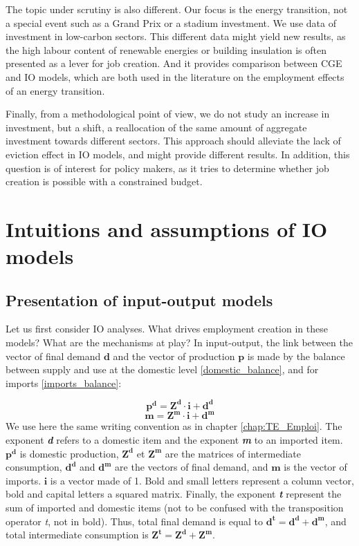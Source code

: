 The topic under scrutiny is also different. Our focus is the energy transition, not a special event such as a Grand Prix or a stadium investment. We use data of investment in low-carbon sectors. This different data might yield new results, as the high labour content of renewable energies or building insulation is often presented as a lever for job creation. And it provides comparison between CGE and IO models, which are both used in the literature on the employment effects of an energy transition.

Finally, from a methodological point of view, we do not study an increase in investment, but a shift, a reallocation of the same amount of aggregate investment towards different sectors. This approach should alleviate the lack of eviction effect in IO models, and might provide different results. In addition, this question is of interest for policy makers, as it tries to determine whether job creation is possible with a constrained budget.


\section{Intuitions and assumptions of IO models} \label{sec:intuition}

\subsection{Presentation of input-output models}
Let us first consider IO analyses. What drives employment creation in these models? What are the mechanisms at play?
In input-output, the link between the vector of final demand $\pmb{d}$ and the vector of production $\pmb{p}$ is made by the balance between supply and use at the domestic level \eqref{domestic_balance}, and for imports \eqref{imports_balance}:

\begin{equation}
\pmb{p^d} = \pmb{Z^d} \cdot \pmb{i} + \pmb{d^d}	
\label{domestic_balance}
\end{equation}
\begin{equation}
\pmb{m} = \pmb{Z^m} \cdot \pmb{i} + \pmb{d^m}	
\label{imports_balance}
\end{equation}
We use here the same writing convention as in chapter \ref{chap:TE_Emploi}. 
The exponent \textit{\textbf{d}} refers to a domestic item and the exponent \textit{\textbf{m}} to an imported item. 
$\pmb{p^d}$ is domestic production, $\pmb{Z^d}$ et $\pmb{Z^m}$ are the matrices of intermediate consumption, $\pmb{d^d}$ and $\pmb{d^m}$ are the vectors of final demand, and $\pmb{m}$ is the vector of imports. 
$\pmb{i}$ is a vector made of 1. 
Bold and small letters represent a column vector, bold and capital letters a squared matrix. Finally, the exponent \textit{\textbf{t}} represent the sum of imported and domestic items (not to be confused with the transposition operator \textit{t}, not in bold). Thus, total final demand is equal to $\pmb{d^t=d^d+d^m}$, and total intermediate consumption is $\pmb{Z^t=Z^d+Z^m}$.

